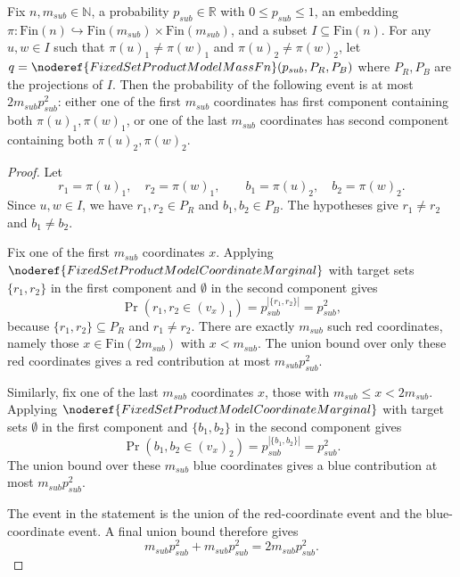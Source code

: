 \begin{helper}
Fix $n, m_{sub} \in \mathbb{N}$, a probability $p_{sub} \in \mathbb{R}$ with $0 \le p_{sub} \le 1$, an embedding $\pi : \mathrm{Fin}(n) \hookrightarrow \mathrm{Fin}(m_{sub}) \times \mathrm{Fin}(m_{sub})$, and a subset $I \subseteq \mathrm{Fin}(n)$.
For any $u, w \in I$ such that $\pi(u)_1 \neq \pi(w)_1$ and $\pi(u)_2 \neq \pi(w)_2$, let $q = \noderef{FixedSetProductModelMassFn}(p_{sub}, P_R, P_B)$ where $P_R, P_B$ are the projections of $I$.
Then the probability of the following event is at most
\(2m_{sub}p_{sub}^2\): either one of the first \(m_{sub}\) coordinates has
first component containing both \(\pi(u)_1,\pi(w)_1\), or one of the last
\(m_{sub}\) coordinates has second component containing both
\(\pi(u)_2,\pi(w)_2\).
\end{helper}
\begin{proof}
Let
\[
r_1=\pi(u)_1,\quad r_2=\pi(w)_1,\qquad
b_1=\pi(u)_2,\quad b_2=\pi(w)_2.
\]
Since \(u,w\in I\), we have \(r_1,r_2\in P_R\) and \(b_1,b_2\in P_B\).
The hypotheses give \(r_1\ne r_2\) and \(b_1\ne b_2\).

Fix one of the first \(m_{sub}\) coordinates \(x\).  Applying
\(\noderef{FixedSetProductModelCoordinateMarginal}\) with target sets
\(\{r_1,r_2\}\) in the first component and \(\emptyset\) in the second
component gives
\[
\Pr(r_1,r_2\in (v_x)_1)=p_{sub}^{|\{r_1,r_2\}|}=p_{sub}^2,
\]
because \(\{r_1,r_2\}\subseteq P_R\) and \(r_1\ne r_2\).  There are exactly
\(m_{sub}\) such red coordinates, namely those \(x\in\mathrm{Fin}(2m_{sub})\)
with \(x<m_{sub}\).  The union bound over only these red coordinates gives a
red contribution at most \(m_{sub}p_{sub}^2\).

Similarly, fix one of the last \(m_{sub}\) coordinates \(x\), those with
\(m_{sub}\le x<2m_{sub}\).  Applying
\(\noderef{FixedSetProductModelCoordinateMarginal}\) with target sets
\(\emptyset\) in the first component and \(\{b_1,b_2\}\) in the second
component gives
\[
\Pr(b_1,b_2\in (v_x)_2)=p_{sub}^{|\{b_1,b_2\}|}=p_{sub}^2.
\]
The union bound over these \(m_{sub}\) blue coordinates gives a blue
contribution at most \(m_{sub}p_{sub}^2\).

The event in the statement is the union of the red-coordinate event and the
blue-coordinate event.  A final union bound therefore gives
\[
m_{sub}p_{sub}^2+m_{sub}p_{sub}^2
=2m_{sub}p_{sub}^2.
\]
\end{proof}
